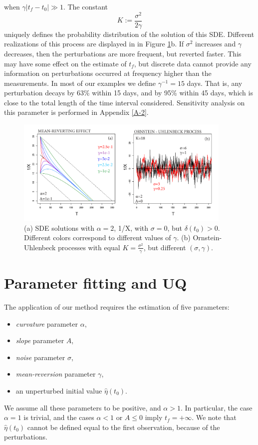 \documentclass{article}
\begin{document}
when $\gamma|t_f-t_0|\gg1$. The constant
$$K:=\frac{\sigma^2}{2\gamma}$$
uniquely defines the probability distribution of the solution of this SDE. Different realizations of this process are displayed in in Figure \ref{Fig3}b. If $\sigma^2$ increases and $\gamma$ decreases, then the perturbations are more frequent, but reverted faster. This may have some effect on the estimate of $t_f$, but discrete data cannot provide any information on perturbations occurred at frequency higher than the measurements. In most of our examples we define $\gamma^{-1}=15$ days. That is, any perturbation decays by 63\% within 15 days, and by 95\% within 45 days, which is close to the total length of the time interval considered. Sensitivity analysis on this parameter is performed in Appendix \ref{A-2}.

\begin{figure}[H]
\centering
\includegraphics[width=0.92\textwidth]{Fig3_plus.png}
\caption{(a) SDE solutions with $\alpha=2$, 1/X, with $\sigma=0$, but $\delta(t_0)>0$. Different colors correspond to different values of $\gamma$. (b) Ornstein-Uhlenbeck processes with equal $K=\frac{\sigma^2}{\gamma}$, but different $(\sigma, \gamma)$.}
\label{Fig3}
\end{figure}

\section{Parameter fitting and UQ}\label{s4}
The application of our method requires the estimation of five parameters:
\begin{itemize}
  \item {\it curvature} parameter $\alpha$,
  \item {\it slope} parameter $A$,
  \item {\it noise} parameter $\sigma$,
  \item {\it mean-reversion} parameter $\gamma$,
  \item an unperturbed initial value $\hat\eta(t_0)$.
\end{itemize}
We assume all these parameters to be positive, and $\alpha > 1$. In particular, the case $\alpha=1$ is trivial, and the cases $\alpha <1$ or $A\le0$ imply $t_f=+\infty$. We note that $\hat\eta(t_0)$ cannot be defined equal to the first observation, because of the perturbations.
\end{document}

